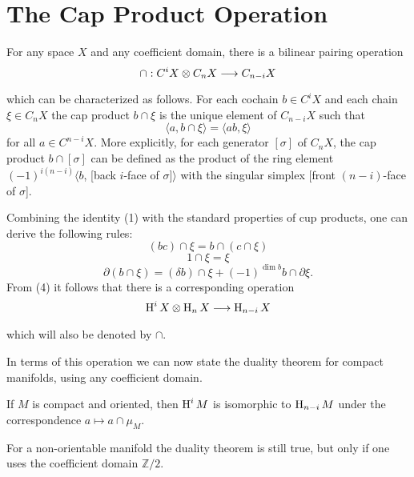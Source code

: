 \documentclass[../main]{subfiles}
\begin{document}
\section{The Cap Product Operation}\label{sec:A.9}

For any space $X$ and any coefficient domain, there is a bilinear pairing operation
\[
\cap: C^i X \otimes C_n X \varrightarrow{} C_{n-i} X
\]
which can be characterized as follows. For each cochain $b \in C^{i} X$ and each chain $\xi \in C_{n} X$ the cap product $b \cap \xi$ is the unique element of $C_{n-i} X$ such that
\[\tag{1}\label{eqn:A.1}\langle a, b \cap \xi\rangle=\langle ab, \xi\rangle\]
for all $a \in C^{n-i} X$. More explicitly, for each generator $[\sigma]$ of $C_{n} X$, the cap product $b \cap[\sigma]$ can be defined as the product of the ring element \newline $(-1)^{i(n-i)} \langle b$, [back $i$-face of $\sigma] \rangle$ with the singular simplex [front $(n-i)$-face of $\sigma$].

Combining the identity (1) with the standard properties of cup products, one can derive the following rules:
\[\tag{2}\label{eqn:A.2}(bc) \cap \xi=b \cap(c \cap \xi)\]
\[\tag{3}\label{eqn:A.3} 1\cap \xi=\xi\]
\[\tag{4}\label{eqn:A.4}\partial(b \cap \xi)=(\delta b) \cap \xi+(-1)^{\dim b} b \cap \partial \xi.\]
From (4) it follows that there is a corresponding operation
\[ \homology^{i}X \otimes \homology_{n}X \varrightarrow{} \homology_{n-i}X \]
which will also be denoted by $\cap$.

In terms of this operation we can now state the duality theorem for compact manifolds, using any coefficient domain.

\begin{theorem*}\label{thm:22.8} If $M$ is compact and oriented, then $\operatorname{H}^{i}M$ is isomorphic to $\operatorname{H}_{n-i}M$ under the correspondence $a \mapsto a \cap \mu_{M}$.
\end{theorem*}

For a non-orientable manifold the duality theorem is still true, but only if one uses the coefficient domain $\mathbb{Z}/2$. 
\end{document}
